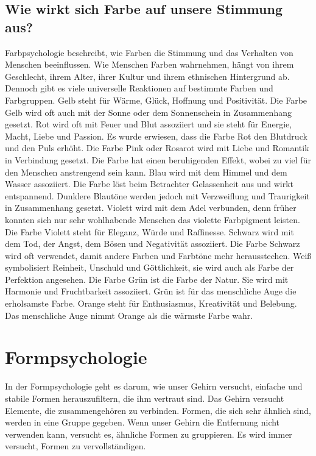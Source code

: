 \subsection{Wie wirkt sich Farbe auf unsere Stimmung aus?}
Farbpsychologie beschreibt, wie Farben die Stimmung und das Verhalten von Menschen beeinflussen. Wie Menschen Farben wahrnehmen, hängt von ihrem Geschlecht, ihrem Alter, ihrer Kultur und ihrem ethnischen Hintergrund ab. Dennoch gibt es viele universelle Reaktionen auf bestimmte Farben und Farbgruppen. 
Gelb steht für Wärme, Glück, Hoffnung und Positivität. Die Farbe Gelb wird oft auch mit der Sonne oder dem Sonnenschein in Zusammenhang gesetzt.
Rot wird oft mit Feuer und Blut assoziiert und sie steht für Energie, Macht, Liebe und Passion. Es wurde erwiesen, dass die Farbe Rot den Blutdruck und den Puls erhöht. 
Die Farbe Pink oder Rosarot wird mit Liebe und Romantik in Verbindung gesetzt. Die Farbe hat einen beruhigenden Effekt, wobei zu viel für den Menschen anstrengend sein kann.
Blau wird mit dem Himmel und dem Wasser assoziiert. Die Farbe löst beim Betrachter Gelassenheit aus und wirkt entspannend. Dunklere Blautöne werden jedoch mit Verzweiflung und Traurigkeit in Zusammenhang gesetzt. 
Violett wird mit dem Adel verbunden, denn früher konnten sich nur sehr wohlhabende Menschen das violette Farbpigment leisten. Die Farbe Violett steht für Eleganz, Würde und Raffinesse. 
Schwarz wird mit dem Tod, der Angst, dem Bösen und Negativität assoziiert. Die Farbe Schwarz wird oft verwendet, damit andere Farben und Farbtöne mehr herausstechen. 
Weiß symbolisiert Reinheit, Unschuld und Göttlichkeit, sie wird auch als Farbe der Perfektion angesehen. 
Die Farbe Grün ist die Farbe der Natur. Sie wird mit Harmonie und Fruchtbarkeit assoziiert. Grün ist für das menschliche Auge die erholsamste Farbe. 
Orange steht für Enthusiasmus, Kreativität und Belebung. Das menschliche Auge nimmt Orange als die wärmste Farbe wahr. 
\cite{mollica2018special}

\section{Formpsychologie}
In der Formpsychologie geht es darum, wie unser Gehirn versucht, einfache und stabile Formen herauszufiltern, die ihm vertraut sind. Das Gehirn versucht Elemente, die zusammengehören zu verbinden. Formen, die sich sehr ähnlich sind, werden in eine Gruppe gegeben. Wenn unser Gehirn die Entfernung nicht verwenden kann, versucht es, ähnliche Formen zu gruppieren. Es wird immer versucht, Formen zu vervollständigen.
\cite{solarski2012drawing}


